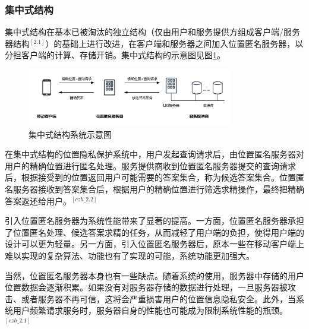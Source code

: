 \documentclass[zihao=-4]{ctexart}
\begin{document}
\subsubsection{集中式结构}
集中式结构在基本已被淘汰的独立结构（仅由用户和服务提供方组成客户端/服务器结构$^{[2.1]}$）的基础上进行改进，在客户端和服务器之间加入位置匿名服务器，以分担客户端的计算、存储开销。集中式结构的示意图见图\ref{集中式结构}。

\begin{figure}[H] %
	\centering %
	\includegraphics[width=0.8\textwidth]{./include_picture/集中式结构（绪论-研究现状）} %
	\caption{集中式结构系统示意图} %
	\label{集中式结构} %
\end{figure}

在集中式结构的位置隐私保护系统中，用户发起查询请求后，由位置匿名服务器对用户的精确位置进行匿名处理。服务提供商收到位置匿名服务器提交的查询请求后，根据接受到的位置返回用户可能需要的答案集合，称为候选答案集合。位置匿名服务器接收到答案集合后，根据用户的精确位置进行筛选求精操作，最终把精确答案返还给用户。$^{[czh\_2.2]}$
\par
引入位置匿名服务器为系统性能带来了显著的提高。一方面，位置匿名服务器承担了位置匿名处理、候选答案求精的任务，从而减轻了用户端的负担，使得用户端的设计可以更为轻量。另一方面，引入位置匿名服务器后，原本一些在移动客户端上难以实现的复杂算法、功能也有了实现的可能，系统功能更加强大。
\par
当然，位置匿名服务器本身也有一些缺点。随着系统的使用，服务器中存储的用户位置数据会逐渐积累。如果没有对服务器存储的数据进行处理，一旦服务器被攻击、或者服务器不再可信，这将会严重损害用户的位置信息隐私安全。此外，当系统用户频繁请求服务时，服务器自身的性能也可能成为限制系统性能的瓶颈。$^{[czh\_2.1]}$
\end{document}
